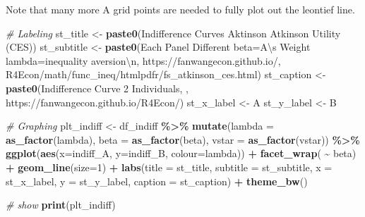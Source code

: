 \documentclass[
]{book}
\newenvironment{Shaded}{\begin{snugshade}}{\end{snugshade}}
\newcommand{\CharTok}[1]{\textcolor[rgb]{0.31,0.60,0.02}{#1}}
\newcommand{\CommentTok}[1]{\textcolor[rgb]{0.56,0.35,0.01}{\textit{#1}}}
\newcommand{\DataTypeTok}[1]{\textcolor[rgb]{0.13,0.29,0.53}{#1}}
\newcommand{\DecValTok}[1]{\textcolor[rgb]{0.00,0.00,0.81}{#1}}
\newcommand{\KeywordTok}[1]{\textcolor[rgb]{0.13,0.29,0.53}{\textbf{#1}}}
\newcommand{\NormalTok}[1]{#1}
\newcommand{\OperatorTok}[1]{\textcolor[rgb]{0.81,0.36,0.00}{\textbf{#1}}}
\newcommand{\StringTok}[1]{\textcolor[rgb]{0.31,0.60,0.02}{#1}}
\begin{document}
Note that many more A grid points are needed to fully plot out the leontief line.

\begin{Shaded}
\begin{Highlighting}[]
\CommentTok{\# Labeling}
\NormalTok{st\_title \textless{}{-}}\StringTok{ }\KeywordTok{paste0}\NormalTok{(}\StringTok{\textquotesingle{}Indifference Curves Aktinson Atkinson Utility (CES)\textquotesingle{}}\NormalTok{)}
\NormalTok{st\_subtitle \textless{}{-}}\StringTok{ }\KeywordTok{paste0}\NormalTok{(}\StringTok{\textquotesingle{}Each Panel Different beta=A}\CharTok{\textbackslash{}\textquotesingle{}}\StringTok{s Weight lambda=inequality aversion}\CharTok{\textbackslash{}n}\StringTok{\textquotesingle{}}\NormalTok{,}
                      \StringTok{\textquotesingle{}https://fanwangecon.github.io/\textquotesingle{}}\NormalTok{,}
                      \StringTok{\textquotesingle{}R4Econ/math/func\_ineq/htmlpdfr/fs\_atkinson\_ces.html\textquotesingle{}}\NormalTok{)}
\NormalTok{st\_caption \textless{}{-}}\StringTok{ }\KeywordTok{paste0}\NormalTok{(}\StringTok{\textquotesingle{}Indifference Curve 2 Individuals, \textquotesingle{}}\NormalTok{,}
                     \StringTok{\textquotesingle{}https://fanwangecon.github.io/R4Econ/\textquotesingle{}}\NormalTok{)}
\NormalTok{st\_x\_label \textless{}{-}}\StringTok{ \textquotesingle{}A\textquotesingle{}}
\NormalTok{st\_y\_label \textless{}{-}}\StringTok{ \textquotesingle{}B\textquotesingle{}}

\CommentTok{\# Graphing}
\NormalTok{plt\_indiff \textless{}{-}}\StringTok{ }
\StringTok{  }\NormalTok{df\_indiff }\OperatorTok{\%\textgreater{}\%}\StringTok{ }\KeywordTok{mutate}\NormalTok{(}\DataTypeTok{lambda =} \KeywordTok{as\_factor}\NormalTok{(lambda),}
                       \DataTypeTok{beta =} \KeywordTok{as\_factor}\NormalTok{(beta),}
                       \DataTypeTok{vstar =} \KeywordTok{as\_factor}\NormalTok{(vstar)) }\OperatorTok{\%\textgreater{}\%}
\StringTok{  }\KeywordTok{ggplot}\NormalTok{(}\KeywordTok{aes}\NormalTok{(}\DataTypeTok{x=}\NormalTok{indiff\_A, }\DataTypeTok{y=}\NormalTok{indiff\_B,}
             \DataTypeTok{colour=}\NormalTok{lambda)) }\OperatorTok{+}
\StringTok{  }\KeywordTok{facet\_wrap}\NormalTok{( }\OperatorTok{\textasciitilde{}}\StringTok{ }\NormalTok{beta) }\OperatorTok{+}
\StringTok{  }\KeywordTok{geom\_line}\NormalTok{(}\DataTypeTok{size=}\DecValTok{1}\NormalTok{) }\OperatorTok{+}
\StringTok{  }\KeywordTok{labs}\NormalTok{(}\DataTypeTok{title =}\NormalTok{ st\_title, }\DataTypeTok{subtitle =}\NormalTok{ st\_subtitle,}
       \DataTypeTok{x =}\NormalTok{ st\_x\_label, }\DataTypeTok{y =}\NormalTok{ st\_y\_label, }\DataTypeTok{caption =}\NormalTok{ st\_caption) }\OperatorTok{+}
\StringTok{  }\KeywordTok{theme\_bw}\NormalTok{()}

\CommentTok{\# show}
\KeywordTok{print}\NormalTok{(plt\_indiff)}
\end{Highlighting}
\end{Shaded}
\end{document}
